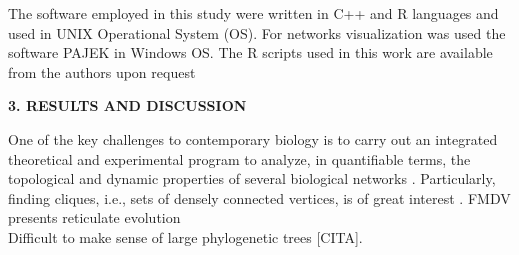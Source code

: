 \documentclass[12pt]{article}
\begin{document}
The software employed in this study were written in C++ and R \cite{R} languages and used in UNIX Operational System (OS). For networks visualization was used the software PAJEK \cite{Pajek} in Windows OS. The R scripts used in this work are available from the authors upon request
 
\bigskip
\bigskip

\textbf{3. RESULTS AND DISCUSSION}

\bigskip
\bigskip
One of the key challenges to contemporary biology is to carry out an integrated theoretical and experimental program to analyze, in quantifiable terms, the topological and dynamic properties of several biological networks \cite{Barabasi2004}.
Particularly, finding cliques, i.e., sets of densely connected vertices, is of great interest \cite{newman, surprise1}.
FMDV presents reticulate evolution \cite{reticulateFMDV}\\
Difficult to make sense of large phylogenetic trees [CITA].\\   
\newpage
\end{document}
